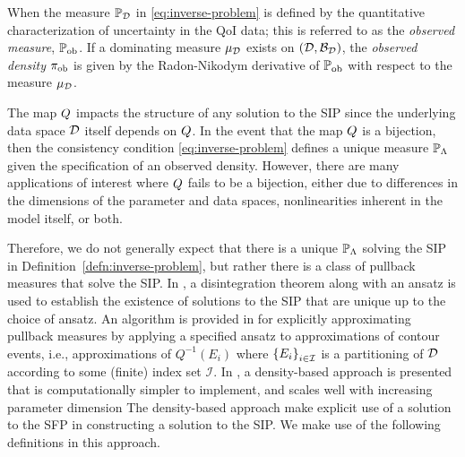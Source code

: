 \begin{defn}\label{defn:observed}
  When the measure $\mathbb{P}_{\mathcal{D}}$ in \eqref{eq:inverse-problem} is defined by the quantitative characterization of uncertainty in the QoI data; this is referred to as the \emph{observed measure}, $\operatorname*{\mathbb{P}_{ob}}$.
  If a dominating measure $\mu_{\mathcal{D}}$ exists on $(\mathcal{D}, \mathcal{B}_{\mathcal{D}})$, the \emph{observed density} $\operatorname*{\pi_{ob}}$ is given by the Radon-Nikodym derivative of $\operatorname*{\mathbb{P}_{ob}}$ with respect to the measure $\mu_{\mathcal{D}}$.
\end{defn}


The map $Q$ impacts the structure of any solution to the SIP since the underlying data space $\mathcal{D}$ itself depends on $Q$.
In the event that the map $Q$ is a bijection, then the consistency condition \eqref{eq:inverse-problem} defines a unique measure $\mathbb{P}_{\Lambda}$ given the specification of an observed density.
However, there are many applications of interest where $Q$ fails to be a bijection, either due to differences in the dimensions of the parameter and data spaces, nonlinearities inherent in the model itself, or both.


Therefore, we do not generally expect that there is a unique $\mathbb{P}_{\Lambda}$ solving the SIP in Definition~\ref{defn:inverse-problem}, but rather there is a class of pullback measures that solve the SIP.
In \cite{BET+14}, a disintegration theorem \cite{Chang_Pollard} along with an ansatz is used to establish the existence of solutions to the SIP that are unique up to the choice of ansatz.
An algorithm is provided in \cite{BET+14} for explicitly approximating pullback measures by applying a specified ansatz to approximations of contour events, i.e., approximations of $Q^{-1}(E_i)$ where $\left\{E_i\right\}_{i\in\mathcal{I}}$ is a partitioning of $\mathcal{D}$ according to some (finite) index set $\mathcal{I}$.
In \cite{BJW18a}, a density-based approach is presented that is computationally simpler to implement, and scales well with increasing parameter dimension
The density-based approach make explicit use of a solution to the SFP in constructing a solution to the SIP.
We make use of the following definitions in this approach.

